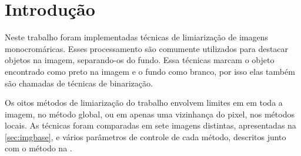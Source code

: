 \section{Introdução} \label{sec:intro}

Neste trabalho foram implementadas técnicas de limiarização de imagens monocromáricas. Esses processamento são comumente utilizados para destacar objetos na imagem, separando-os do fundo. Essa técnicas marcam o objeto encontrado como preto na imagem e o fundo como branco, por isso elas também são chamadas de técnicas de binarização.

Os oitos métodos de limiarização do trabalho envolvem limites em em toda a imagem, no método global, ou em apenas uma vizinhança do pixel, nos métodos locais. As técnicas foram comparadas em sete imagens distintas, apresentadas na \cref{sec:imgbase}, e vários parâmetros de controle de cada método, descritos junto com o método na .
